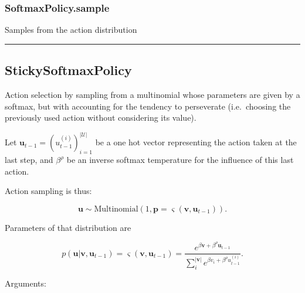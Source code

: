 \hypertarget{softmaxpolicy.sample}{%
\subsubsection{SoftmaxPolicy.sample}\label{softmaxpolicy.sample}}

\begin{Shaded}
\begin{Highlighting}[]
\end{Highlighting}
\end{Shaded}

Samples from the action distribution

\begin{center}\rule{0.5\linewidth}{\linethickness}\end{center}

\hypertarget{stickysoftmaxpolicy}{%
\subsection{StickySoftmaxPolicy}\label{stickysoftmaxpolicy}}

\begin{Shaded}
\begin{Highlighting}[]
\end{Highlighting}
\end{Shaded}

Action selection by sampling from a multinomial whose parameters are
given by a softmax, but with accounting for the tendency to perseverate
(i.e.~choosing the previously used action without considering its
value).

Let \(\mathbf u_{t-1} = (u_{t-1}^{(i)})_{i=1}^{|\mathcal U|}\) be a one
hot vector representing the action taken at the last step, and
\(\beta^\rho\) be an inverse softmax temperature for the influence of
this last action.

Action sampling is thus:

\[
\mathbf u \sim \mathrm{Multinomial}(1, \mathbf p=\varsigma(\mathbf v, \mathbf u_{t-1})).
\]

Parameters of that distribution are

\[
p(\mathbf u|\mathbf v, \mathbf u_{t-1}) = \varsigma(\mathbf v, \mathbf u_{t-1}) = \frac{e^{\beta \mathbf v + \beta^\rho \mathbf u_{t-1}}}{\sum_{i}^{|\mathbf v|} e^{\beta v_i + \beta^\rho u_{t-1}^{(i)}}}.
\]

Arguments:

